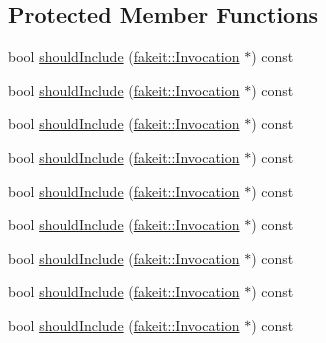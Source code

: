 \subsection*{Protected Member Functions}
\begin{DoxyCompactItemize}
\item 
bool \mbox{\hyperlink{structfakeit_1_1AggregateInvocationsSource_a7e02b97ba9e4b12765d7d46420fab1e7}{should\+Include}} (\mbox{\hyperlink{structfakeit_1_1Invocation}{fakeit\+::\+Invocation}} $\ast$) const
\item 
bool \mbox{\hyperlink{structfakeit_1_1AggregateInvocationsSource_a7e02b97ba9e4b12765d7d46420fab1e7}{should\+Include}} (\mbox{\hyperlink{structfakeit_1_1Invocation}{fakeit\+::\+Invocation}} $\ast$) const
\item 
bool \mbox{\hyperlink{structfakeit_1_1AggregateInvocationsSource_a7e02b97ba9e4b12765d7d46420fab1e7}{should\+Include}} (\mbox{\hyperlink{structfakeit_1_1Invocation}{fakeit\+::\+Invocation}} $\ast$) const
\item 
bool \mbox{\hyperlink{structfakeit_1_1AggregateInvocationsSource_a7e02b97ba9e4b12765d7d46420fab1e7}{should\+Include}} (\mbox{\hyperlink{structfakeit_1_1Invocation}{fakeit\+::\+Invocation}} $\ast$) const
\item 
bool \mbox{\hyperlink{structfakeit_1_1AggregateInvocationsSource_a7e02b97ba9e4b12765d7d46420fab1e7}{should\+Include}} (\mbox{\hyperlink{structfakeit_1_1Invocation}{fakeit\+::\+Invocation}} $\ast$) const
\item 
bool \mbox{\hyperlink{structfakeit_1_1AggregateInvocationsSource_a7e02b97ba9e4b12765d7d46420fab1e7}{should\+Include}} (\mbox{\hyperlink{structfakeit_1_1Invocation}{fakeit\+::\+Invocation}} $\ast$) const
\item 
bool \mbox{\hyperlink{structfakeit_1_1AggregateInvocationsSource_a7e02b97ba9e4b12765d7d46420fab1e7}{should\+Include}} (\mbox{\hyperlink{structfakeit_1_1Invocation}{fakeit\+::\+Invocation}} $\ast$) const
\item 
bool \mbox{\hyperlink{structfakeit_1_1AggregateInvocationsSource_a7e02b97ba9e4b12765d7d46420fab1e7}{should\+Include}} (\mbox{\hyperlink{structfakeit_1_1Invocation}{fakeit\+::\+Invocation}} $\ast$) const
\item 
bool \mbox{\hyperlink{structfakeit_1_1AggregateInvocationsSource_a7e02b97ba9e4b12765d7d46420fab1e7}{should\+Include}} (\mbox{\hyperlink{structfakeit_1_1Invocation}{fakeit\+::\+Invocation}} $\ast$) const
\end{DoxyCompactItemize}


